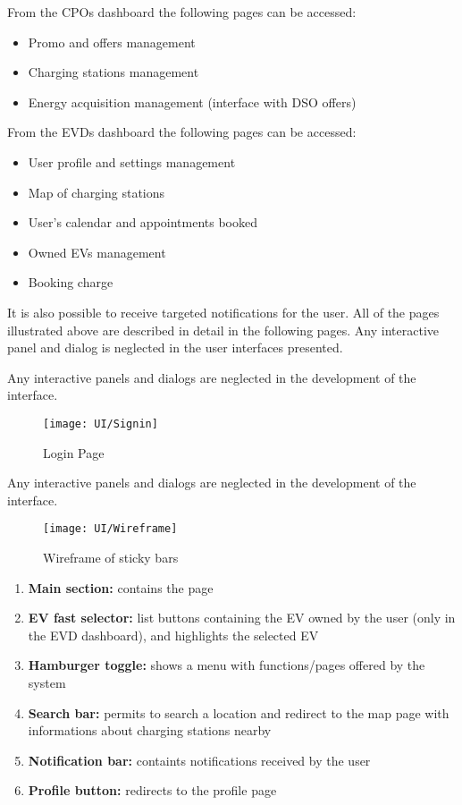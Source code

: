 From the CPOs dashboard the following pages can be accessed:

\begin{itemize}
	\item Promo and offers management
	\item Charging stations management
	\item Energy acquisition management (interface with DSO offers)
\end{itemize}

From the EVDs dashboard the following pages can be accessed:

\begin{itemize}
	\item User profile and settings management
	\item Map of charging stations
	\item User’s calendar and appointments booked
	\item Owned EVs management
	\item Booking charge
\end{itemize}

It is also possible to receive targeted notifications for the user. All of the pages illustrated above are described in detail in the following pages. Any interactive panel and dialog is neglected in the user interfaces presented.

Any interactive panels and dialogs are neglected in the development of the interface.

\begin{figure} [H]
	\begin{center}
		\texttt{[image: UI/Signin]}
		\caption{Login Page}
		\label{fig: cd}
	\end{center}
\end{figure}

Any interactive panels and dialogs are neglected in the development of the interface.

\begin{figure} [H]
	\begin{center}
		\texttt{[image: UI/Wireframe]}
		\caption{Wireframe of sticky bars}
		\label{fig: cd}
	\end{center}
\end{figure}

\begin{enumerate}
	\item \textbf{Main section:} contains the page
	\item \textbf{EV fast selector:} list buttons containing the EV owned by the user (only in the EVD dashboard), and highlights the selected EV
	\item \textbf{Hamburger toggle:} shows a menu with functions/pages offered by the system
	\item \textbf{Search bar:} permits to search a location and redirect to the map page with informations about charging stations nearby
	\item \textbf{Notification bar:} containts notifications received by the user
	\item \textbf{Profile button:} redirects to the profile page
\end{enumerate}

